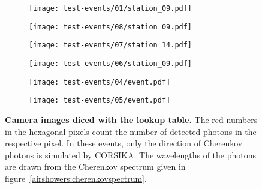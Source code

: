 \begin{figure}[H]
	\begin{subfigure}[t]{0.49\textwidth}
		\texttt{[image: test-events/01/station\_09.pdf]}
		\subcaption{}
		\label{corsika-events:1}
	\end{subfigure}
	\begin{subfigure}[t]{0.49\textwidth}
		\texttt{[image: test-events/08/station\_09.pdf]}
		\subcaption{}
		\label{corsika-events:2}
	\end{subfigure}
	\begin{subfigure}[t]{0.49\textwidth}
		\texttt{[image: test-events/07/station\_14.pdf]}
		\subcaption{}
		\label{corsika-events:3}
	\end{subfigure}
	\begin{subfigure}[t]{0.49\textwidth}
		\texttt{[image: test-events/06/station\_09.pdf]}
		\subcaption{}
		\label{corsika-events:4}
	\end{subfigure}
	\begin{subfigure}[t]{0.49\textwidth}
		\texttt{[image: test-events/04/event.pdf]}
		\subcaption{}
		\label{corsika-events:5}
	\end{subfigure}
	\begin{subfigure}[t]{0.49\textwidth}
		\texttt{[image: test-events/05/event.pdf]}
		\subcaption{}
		\label{corsika-events:6}
	\end{subfigure}
	\caption[Camera images diced with the lookup table]{\textbf{Camera images diced with the lookup table.} The red numbers in the hexagonal pixels count the number of detected photons in the respective pixel. In these events, only the direction of Cherenkov photons is simulated by CORSIKA. The wavelengths of the photons are drawn from the Cherenkov spectrum given in figure~\ref{airshowers:cherenkovspectrum}.}
	\label{corsika-events}
\end{figure}